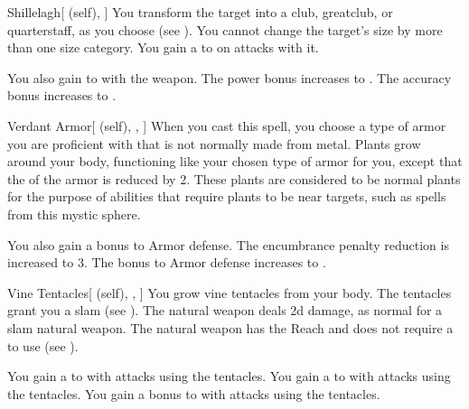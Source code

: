 \lowercase{\hypertarget{spell:Shillelagh}{}}\label{spell:Shillelagh}
\begin{attuneability}[Rank 1]{\hypertarget{spell:Shillelagh}{Shillelagh}}[ (self), ]
You transform the target into a club, greatclub, or quarterstaff, as you choose (see ).
You cannot change the target's size by more than one size category.
You gain a   to  on attacks with it.

\rankline
{} You also gain   to  with the weapon.
 The power bonus increases to .
 The accuracy bonus increases to .
\end{attuneability}
\vspace{0.25em}



\lowercase{\hypertarget{spell:Verdant Armor}{}}\label{spell:Verdant Armor}
\begin{attuneability}[Rank 1]{\hypertarget{spell:Verdant Armor}{Verdant Armor}}[ (self), , ]
When you cast this spell, you choose a type of armor you are proficient with that is not normally made from metal.
Plants grow around your body, functioning like your chosen type of armor for you, except that the  of the armor is reduced by 2.
These plants are considered to be normal plants for the purpose of abilities that require plants to be near targets, such as spells from this mystic sphere.

\rankline
{} You also gain a  bonus to Armor defense.
 The encumbrance penalty reduction is increased to 3.
 The bonus to Armor defense increases to .
\end{attuneability}
\vspace{0.25em}



\lowercase{\hypertarget{spell:Vine Tentacles}{}}\label{spell:Vine Tentacles}
\begin{attuneability}[Rank 1]{\hypertarget{spell:Vine Tentacles}{Vine Tentacles}}[ (self), , ]
You grow vine tentacles from your body.
The tentacles grant you a slam  (see ).
The natural weapon deals \plus2d damage, as normal for a slam natural weapon.
The natural weapon has the Reach  and does not require a  to use (see ).

\rankline
{} You gain a   to  with attacks using the tentacles.
 You gain a   to  with attacks using the tentacles.
 You gain a  bonus to  with attacks using the tentacles.
\end{attuneability}
\vspace{0.25em}



